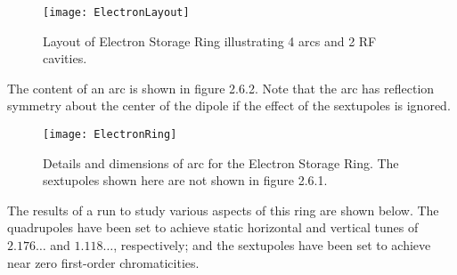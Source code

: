 \begin{figure}[hbp]
  \centering
  \texttt{[image: ElectronLayout]}
  \caption{Layout of Electron Storage Ring illustrating
                          4 arcs and 2 RF cavities.}
\end{figure}


    The content of an arc is shown in figure 2.6.2.  Note that the arc has
reflection symmetry about the center of the dipole if the effect of the
sextupoles is ignored.

\begin{figure}[htbp]
  \centering
  \texttt{[image: ElectronRing]}
  \caption{Details and dimensions of arc for the Electron Storage Ring.  The sextupoles
shown here are not shown in figure 2.6.1.}
\end{figure}

     The results of a \Mary run to study various aspects of this ring are
shown below.  The quadrupoles have been set to achieve static horizontal
and vertical tunes of $2.176\ldots$ and $1.118\ldots$, respectively; and the
sextupoles have been set to achieve near zero first-order chromaticities.
\pagebreak

